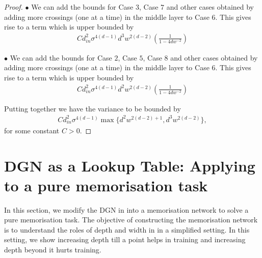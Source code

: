 \begin{appendix}
\begin{proof}
$\bullet$ We can add the bounds for Case $3$, Case $7$ and other cases obtained by adding more crossings (one at a time) in the middle layer to Case $6$. This gives rise to a term which is upper bounded by 
\begin{align*}
C d^2_{in}\sigma^{4(d-1)}d^3w^{2(d-2)} \left(\frac{1}{1-4dw^{-2}}\right)
\end{align*}



$\bullet$ We can add the bounds for Case $2$, Case $5$, Case $8$ and other cases obtained by adding more crossings (one at a time) in the middle layer to Case $6$. This gives rise to a term which is upper bounded by 
\begin{align*}
C d^2_{in}\sigma^{4(d-1)}d^2w^{2(d-2)} \left(\frac{1}{1-4dw^{-2}}\right)
\end{align*}

Putting together we have the variance to be bounded by 
\begin{align*}
Cd^2_{in}\sigma^{4(d-1)}\max\{d^2w^{2(d-2)+1}, d^3w^{2(d-2)}\},
\end{align*}
for some constant $C>0$.
\end{proof}




\section{DGN as a Lookup Table: Applying  to a pure memorisation task}

In this section, we modify the DGN in  into a memorisation network to solve a pure memorisation task. The objective of constructing the memorisation network is to understand the roles of depth and width in  in a simplified setting. In this setting, we show increasing depth till a point helps in training and increasing depth beyond it hurts training. 


\end{appendix}
